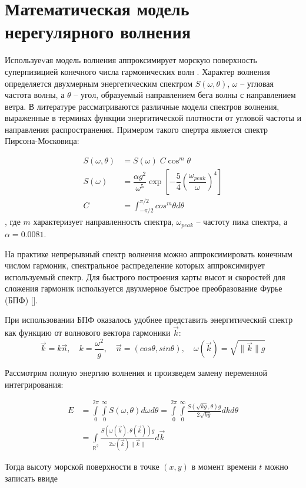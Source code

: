 \section{Математическая модель нерегулярного волнения}

Используеvая модель волнения аппроксимирует морскую поверхность суперпизицией конечного числа гармонических волн \cite{lopatuhin2004}. Характер волнения определяется двухмерным энергетическим спектром $S(\omega, \theta)$, $\omega$ -- угловая частота волны, а $\theta$ -- угол, образуемый направлением бега волны с направлением ветра. В литературе \cite{lopatuhin2004} рассматриваются различные модели спектров волнения, выраженные в терминах функции энергитической плотности от угловой частоты и направления распространения. Примером такого спертра является спектр Пирсона-Московица:

\begin{equation}
\begin{split}
S(\omega, \theta) &= S(\omega) \; C \cos^m\theta \\
S(\omega) &= \dfrac{\alpha g^2}{\omega^5} \exp \left[ 
  -\dfrac{5}{4} \left( \dfrac{\omega_{peak}}{\omega} \right)^{4} 
\right]  \\
C &= \int_{-\pi/2}^{\pi/2} cos^m\theta d\theta
\end{split}
\end{equation}, 
где $m$ характеризует направленность спектра, $\omega_{peak}$ -- частоту пика спектра, а $\alpha = 0.0081$.

На практике непрерывный спектр волнения можно аппроксимировать конечным числом гармоник, спектральное распределение которых аппроксимирует используемый спектр. Для быстрого построения карты высот и скоростей для сложения гармоник используется двухмерное быстрое преобразование Фурье (БПФ) [].
 
При использовании БПФ оказалось удобнее представить энергитический спектр как функцию от волнового вектора гармоники $\vec{k}$:
$$ \vec{k} = k\vec{n},\quad 
k = \frac{\omega^2}{g} ,\quad 
\vec{n}=(cos \theta, sin \theta), \quad 
\omega(\vec{k}) = \sqrt{\lVert \vec{k} \rVert g} $$

Рассмотрим полную энергию волнения и произведем замену переменной интегрирования:

\begin{equation}
\begin{split}
E &= \int\limits_0^{2\pi}
     \int\limits_0^\infty S(\omega, \theta) d\omega d\theta
  = \int\limits_0^{2\pi}
     \int\limits_0^\infty 
         \frac {S(\sqrt{kg}, \theta)g} {2\sqrt{kg}} dk d\theta\\
  &= \int\limits_{\mathbb{R}^2}
         \frac{S(\omega(\vec{k}), \theta(\vec{k})) g}
              {2\omega(\vec{k}) \lVert \vec{k} \rVert} d\vec{k}
\end{split}
\end{equation}

 Тогда высоту морской поверхности в точке $(x, y)$ в момент времени $t$ можно записать ввиде



